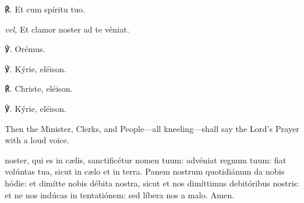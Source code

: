 ℟. Et cum spíritu tuo.\par
\textit{vel,} Et clamor noster ad te véniat.

℣. Orémus.

℣. Kýrie, eléison.

℟. Christe, eléison.

℣. Kýrie, eléison.

\begin{rubric}
    Then the Minister, Clerks, and People---all kneeling---shall say the Lord's Prayer with a loud voice.
\end{rubric}
 noster, qui es in c{\ae}lis, sanctificétur nomen tuum: advéniat regnum tuum: fiat volúntas tua, sicut in c{\ae}lo et in terra. Panem nostrum quotidiánum da nobis hódie: et dimítte nobis débita nostra, sicut et nos dimíttimus debitóribus nostris: et ne nos indúcas in tentatiónem: sed líbera nos a malo. Amen.

